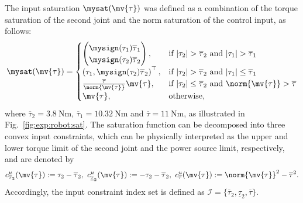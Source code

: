 \documentclass[letterpaper, journal]{IEEEtran}
\begin{document}
The input saturation $\mysat(\mv{\tau})$ was defined as a combination of the torque saturation of the second joint and the norm saturation of the control input, as follows:
\begin{equation} \label{eq:exp:sat}
  \mysat(\mv{\tau})
  =
  \begin{cases}
    \begin{pmatrix}
      \mysign(\tau_1)\overline{\tau}_1
      \\
      \mysign(\tau_2)\overline{\tau}_2
    \end{pmatrix}
    , &
    \text{if }
    \vert\tau_2\vert > \overline{\tau}_2
    \text{ and }
    \vert\tau_1\vert > \overline{\tau}_1
    \\
    \left(
      \tau_1
      , 
      \mysign(\tau_2)\overline{\tau}_2
    \right)^\top
    , &
    \text{if }
    \vert\tau_2\vert > \overline{\tau}_2
    \text{ and }
    \vert\tau_1\vert \le \overline{\tau}_1
    \\
    \tfrac{\overline{\tau}}{\norm{\mv{\tau}}}\mv{\tau}
    , &
    \text{if }
    |\tau_2| \le \overline{\tau}_2
    \text{ and }
    \norm{\mv{\tau}} > \overline{\tau}
    \\
    \mv{\tau}
    , &
    \text{otherwise}
    ,
  \end{cases}
\end{equation}
where $\overline{\tau}_2=\qty{3.8}{\newton\meter}$, $\overline{\tau}_1=\qty{10.32}{\newton\meter}$ and $\overline{\tau}=\qty{11}{\newton\meter}$, as illustrated in Fig.~\ref{fig:exp:robot:sat}.
The saturation function can be decomposed into three convex input constraints, which can be physically interpreted as the upper and lower torque limit of the second joint and the power source limit, respectively, and are denoted by
\begin{equation} \label{eq:val:cstr:input}
  c^u_{\overline{\tau}_2}(\mv{\tau}) 
  := 
  \tau_2 - \overline{\tau}_2
  ,
  \ 
  c^u_{\underline{\tau}_2}(\mv{\tau}) 
  := 
  -\tau_2 - \overline{\tau}_2
  ,
  \ 
  c^u_{\overline{\tau}}(\mv{\tau})
  := 
  \norm{\mv{\tau}}^2 - \overline{\tau}^2
  .
\end{equation}
Accordingly, the input constraint index set is defined as $\mathcal{I} = \{\overline{\tau}_2, \underline{\tau}_2, \overline{\tau}\}$.
\end{document}
